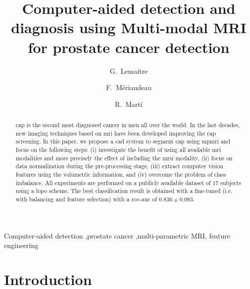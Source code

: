 \documentclass[final,3p,times,twocolumn]{elsarticle}
\begin{document}
\begin{frontmatter}


  \title{Computer-aided detection and diagnosis using Multi-modal MRI for
    prostate cancer detection}

  \author[label1]{G.~Lemaitre}
  \author[label2]{F.~M\'eriaudeau}
  \author[label3]{R.~Mart\'i}

  \address[label1]{Parietal team, Inria, CEA, Universit\'e Paris-Saclay, 1 Rue
    Honor\'e d'Estienne d'Orves, 91120 Palaiseau}
  \address[label2]{LE2I UMR6306, CNRS, Arts et M\'etiers, Univ. Bourgogne
    Franche-Comt\'e, 12 rue de la Fonderie, 71200 Le Creusot}
  \address[label3]{ViCOROB, Universitat de Girona, Campus Montilivi, Edifici P4,
    17071 Girona}

  \begin{abstract}

    \Ac{cap} is the second most diagnosed cancer in men all over the world. In
    the last decades, new imaging techniques based on \ac{mri} have been developed
    improving the \ac{cap} screening. In this paper, we propose a \ac{cad} system
    to segment \ac{cap} using \ac{mpmri} and focus on the following steps: (i)
    investigate the benefit of using all available \ac{mri} modalities and more
    precisely the effect of including the \ac{mrsi} modality, (ii) focus on data
    normalization during the pre-processing stage, (iii) extract computer vision
    features using the volumetric information, and (iv) overcome the problem of
    class imbalance. All experiments are performed on a publicly available dataset
    of 17 subjects using a \ac{lopo} scheme. The best classification result is
    obtained with a fine-tuned (i.e. with balancing and feature selection) with a
    \ac{roc}-\ac{auc} of $0.836 \pm 0.083$.

  \end{abstract}

  \begin{keyword}
    Computer-aided detection \sep prostate cancer \sep multi-parametric MRI\sep
    feature engineering
  \end{keyword}


\end{frontmatter}

\acresetall

\section{Introduction}
\end{document}

